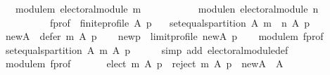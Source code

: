 \begin{isabellebody}
\ \ \ module{\isacharunderscore}{\kern0pt}m{\isacharcolon}{\kern0pt}\ {\isachardoublequoteopen}electoral{\isacharunderscore}{\kern0pt}module\ m{\isachardoublequoteclose}\ \isanewline
\ \ \ \ \ \ \ \ \ \ module{\isacharunderscore}{\kern0pt}n{\isacharcolon}{\kern0pt}\ {\isachardoublequoteopen}electoral{\isacharunderscore}{\kern0pt}module\ n{\isachardoublequoteclose}\ \isanewline
\ \ \ \ \ \ \ \ \ \ f{\isacharunderscore}{\kern0pt}prof{\isacharcolon}{\kern0pt}\ \ {\isachardoublequoteopen}finite{\isacharunderscore}{\kern0pt}profile\ A\ p{\isachardoublequoteclose}\isanewline
\ \ \ {\isachardoublequoteopen}set{\isacharunderscore}{\kern0pt}equals{\isacharunderscore}{\kern0pt}partition\ A\ {\isacharparenleft}{\kern0pt}{\isacharparenleft}{\kern0pt}m\ {\isasymtriangleright}\ n{\isacharparenright}{\kern0pt}\ A\ p{\isacharparenright}{\kern0pt}{\isachardoublequoteclose}\isanewline
%
\isadelimproof
%
\endisadelimproof
%
\isatagproof
{}\isamarkupfalse%
\ {\isacharminus}{\kern0pt}\isanewline
\ \ \isamarkupfalse%
\ {\isacharquery}{\kern0pt}new{\isacharunderscore}{\kern0pt}A\ {\isacharequal}{\kern0pt}\ {\isachardoublequoteopen}defer\ m\ A\ p{\isachardoublequoteclose}\isanewline
\ \ \isamarkupfalse%
\ {\isacharquery}{\kern0pt}new{\isacharunderscore}{\kern0pt}p\ {\isacharequal}{\kern0pt}\ {\isachardoublequoteopen}limit{\isacharunderscore}{\kern0pt}profile\ {\isacharquery}{\kern0pt}new{\isacharunderscore}{\kern0pt}A\ p{\isachardoublequoteclose}\isanewline
\ \ \isamarkupfalse%
\ module{\isacharunderscore}{\kern0pt}m\ f{\isacharunderscore}{\kern0pt}prof\ \isamarkupfalse%
\ {\isachardoublequoteopen}set{\isacharunderscore}{\kern0pt}equals{\isacharunderscore}{\kern0pt}partition\ A\ {\isacharparenleft}{\kern0pt}m\ A\ p{\isacharparenright}{\kern0pt}{\isachardoublequoteclose}\isanewline
\ \ \ \ \isamarkupfalse%
\ {\isacharparenleft}{\kern0pt}simp\ add{\isacharcolon}{\kern0pt}\ electoral{\isacharunderscore}{\kern0pt}module{\isacharunderscore}{\kern0pt}def{\isacharparenright}{\kern0pt}\isanewline
\ \ \isamarkupfalse%
\ module{\isacharunderscore}{\kern0pt}m\ f{\isacharunderscore}{\kern0pt}prof\ \isamarkupfalse%
\ {}{\isacharcolon}{\kern0pt}\isanewline
\ \ \ \ {\isachardoublequoteopen}elect\ m\ A\ p\ {\isasymunion}\ reject\ m\ A\ p\ {\isasymunion}\ {\isacharquery}{\kern0pt}new{\isacharunderscore}{\kern0pt}A\ {\isacharequal}{\kern0pt}\ A{\isachardoublequoteclose}\isanewline
\ \ \ \ \isamarkupfalse%

\end{isabellebody}

